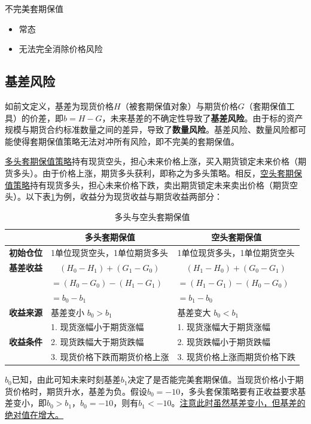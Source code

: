 \documentclass[11pt]{article}
\begin{document}
不完美套期保值
\begin{itemize}
    \item 常态
    \item 无法完全消除价格风险
\end{itemize}

\subsection{基差风险}

如前文定义，基差为现货价格$H$（被套期保值对象）与期货价格$G$（套期保值工具）的价差，即$b = H - G$，未来基差的不确定性导致了\textbf{基差风险}。由于标的资产规模与期货合约标准数量之间的差异，导致了\textbf{数量风险}。基差风险、数量风险都可能使得套期保值策略无法对冲所有风险，即不完美的套期保值。

\uline{多头套期保值策略}持有现货空头，担心未来价格上涨，买入期货锁定未来价格（期货多头）。由于价格上涨，期货多头获利，即称之为多头策略。相反，\uline{空头套期保值策略}持有现货多头，担心未来价格下跌，卖出期货锁定未来卖出价格（期货空头）。以下表\ref{tab:basis-risk}为例，收益分为现货收益与期货收益两部分：

\begin{table}[H]
\centering
\begin{tabular}{@{}cll@{}}
\toprule
\multicolumn{1}{l}{}           
& \multicolumn{1}{c}{\textbf{多头套期保值}} & \multicolumn{1}{c}{\textbf{空头套期保值}} \\
\midrule
\textbf{初始仓位} & 1单位现货空头，1单位期货多头 & 1单位现货多头，1单位期货空头 \\
\textbf{基差收益} &$\quad(H_0 - H_1) + (G_1 - G_0)$ & $\quad(H_1 - H_0) + (G_0 - G_1)$ \\
& $=(H_0 - G_0) - (H_1 - G_1)$ & $=(H_1 - G_1) - (H_0 - G_0)$ \\
& $=b_0 - b_1$ & $=b_1 - b_0$ \\
\textbf{收益来源} & 基差变小 $b_0>b_1$ & 基差变大 $b_0<b_1$\\
\multirow{3}{*}{\textbf{收益条件}} & 1. 现货涨幅小于期货涨幅 & 1. 现货涨幅大于期货涨幅 \\
& 2. 现货跌幅大于期货跌幅 & 2. 现货跌幅小于期货跌幅 \\ 
& 3. 现货价格下跌而期货价格上涨 & 3. 现货价格上涨而期货价格下跌 \\
\bottomrule
\end{tabular}
\caption{多头与空头套期保值}
\label{tab:basis-risk}
\end{table}

$b_0$已知，由此可知未来时刻基差$b_1$决定了是否能完美套期保值。当现货价格小于期货价格时，期货升水，基差为负。假设$b_0=-10$，多头套保策略要有正收益要求基差变小，即$b_0>b_1$，$b_0=-10$，则有$b_1< -10$。\uline{注意此时虽然基差变小，但基差的绝对值在增大。}
\end{document}
